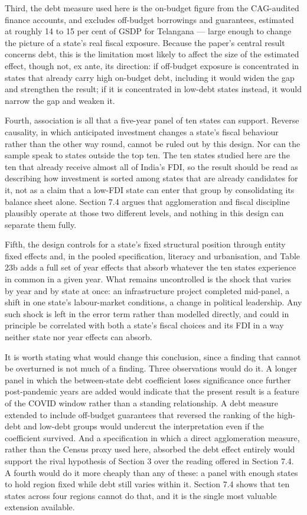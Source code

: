 \documentclass[12pt,a4paper]{article}
\begin{document}
Third, the debt measure used here is the on-budget figure from the CAG-audited finance accounts, and excludes off-budget borrowings and guarantees, estimated at roughly 14 to 15 per cent of GSDP for Telangana --- large enough to change the picture of a state's real fiscal exposure. Because the paper's central result concerns debt, this is the limitation most likely to affect the size of the estimated effect, though not, ex ante, its direction: if off-budget exposure is concentrated in states that already carry high on-budget debt, including it would widen the gap and strengthen the result; if it is concentrated in low-debt states instead, it would narrow the gap and weaken it.

Fourth, association is all that a five-year panel of ten states can support. Reverse causality, in which anticipated investment changes a state's fiscal behaviour rather than the other way round, cannot be ruled out by this design. Nor can the sample speak to states outside the top ten. The ten states studied here are the ten that already receive almost all of India's FDI, so the result should be read as describing how investment is sorted among states that are already candidates for it, not as a claim that a low-FDI state can enter that group by consolidating its balance sheet alone. Section 7.4 argues that agglomeration and fiscal discipline plausibly operate at those two different levels, and nothing in this design can separate them fully.

Fifth, the design controls for a state's fixed structural position through entity fixed effects and, in the pooled specification, literacy and urbanisation, and Table 23b adds a full set of year effects that absorb whatever the ten states experience in common in a given year. What remains uncontrolled is the shock that varies by year and by state at once: an infrastructure project completed mid-panel, a shift in one state's labour-market conditions, a change in political leadership. Any such shock is left in the error term rather than modelled directly, and could in principle be correlated with both a state's fiscal choices and its FDI in a way neither state nor year effects can absorb.

It is worth stating what would change this conclusion, since a finding that cannot be overturned is not much of a finding. Three observations would do it. A longer panel in which the between-state debt coefficient loses significance once further post-pandemic years are added would indicate that the present result is a feature of the COVID window rather than a standing relationship. A debt measure extended to include off-budget guarantees that reversed the ranking of the high-debt and low-debt groups would undercut the interpretation even if the coefficient survived. And a specification in which a direct agglomeration measure, rather than the Census proxy used here, absorbed the debt effect entirely would support the rival hypothesis of Section 3 over the reading offered in Section 7.4. A fourth would do it more cheaply than any of these: a panel with enough states to hold region fixed while debt still varies within it. Section 7.4 shows that ten states across four regions cannot do that, and it is the single most valuable extension available.
\end{document}
